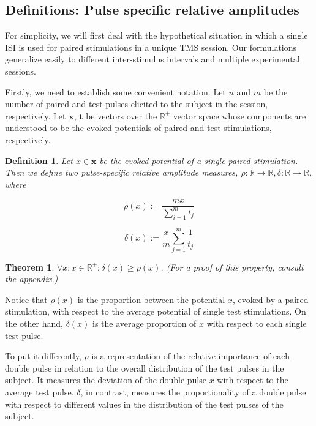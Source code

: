 \documentclass{article}
\newtheorem{definition}{Definition}
\newtheorem{theorem}{Theorem}
\begin{document}
\begin{multicols}{2}
\subsection{Definitions: Pulse specific relative amplitudes}

For simplicity, we will first deal with the hypothetical situation in which a
single ISI is used for paired stimulations in a unique TMS session. Our
formulations generalize easily to different inter-stimulus intervals and
multiple experimental sessions.

Firstly, we need to establish some convenient notation. Let $n$ and $m$ be the
number of paired and test pulses elicited to the subject in the session,
respectively. Let $\textbf{x}$, $\textbf{t}$ be vectors over the $\mathbb{R}^+$
vector space whose components are understood to be the evoked potentials of
paired and test stimulations, respectively.


\begin{definition} 


    Let $x \in \textbf{x}$ be the evoked potential of a single paired
    stimulation. Then we define two pulse-specific relative amplitude measures,
    $\rho : \mathbb{R} \to \mathbb{R}, \delta : \mathbb{R} \to \mathbb{R}$,
    where

    \begin{equation} 
        \rho(x) := \frac{mx}{\sum_{i=1}^mt_j}
    \end{equation}

    \begin{equation} 
        \delta(x) := \frac{x}{m}\sum_{j=1}^m\frac{1}{t_j} 
    \end{equation}
\end{definition}

\begin{theorem} 
    $\forall x: x \in \mathbb{R}^+:\delta(x) \geq \rho(x)$. (For a proof of this
    property, consult the appendix.) 
\end{theorem}

Notice that $\rho(x)$ is the proportion between the potential $x$, evoked by a
paired stimulation, with respect to the average potential of single test
stimulations. On the other hand, $\delta(x)$ is the average proportion of $x$
with respect to each single test pulse. 

To put it differently, $\rho$ is a representation of the relative importance of
each double pulse in relation to the overall distribution of the test pulses in
the subject. It measures the deviation of the double pulse $x$ with respect to
the average test pulse. $\delta$, in contrast, measures the proportionality of a
double pulse with respect to different values in the distribution of the test
pulses of the subject.


\end{multicols}
\end{document}
